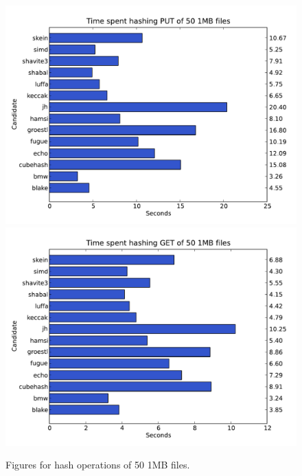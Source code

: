 \documentclass[english,12pt,a4paper]{book}
\begin{document}
\begin{figure}[h!]
    \centering
    \includegraphics[width=0.9\columnwidth]{graphs/TimespenthashingPUTof501MBfiles.pdf}
    \includegraphics[width=0.9\columnwidth]{graphs/TimespenthashingGETof501MBfiles.pdf}
    \caption{Figures for hash operations of 50 1MB files.}
    \label{fig:graph:501mb}
\end{figure}
\end{document}
